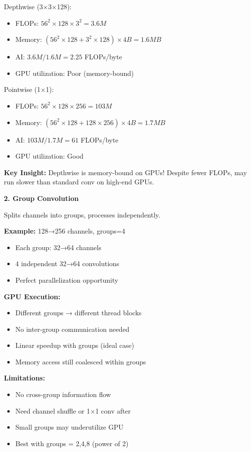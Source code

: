\documentclass[12pt]{article}
\newcommand{\explanation}[1]{{\color{explanationcolor}#1}}
\begin{document}
\begin{enumerate}[(a)]
{{    Depthwise (3×3×128):
    \begin{itemize}
        \item FLOPs: $56^2 \times 128 \times 3^2 = 3.6M$
        \item Memory: $(56^2 \times 128 + 3^2 \times 128) \times 4B = 1.6MB$
        \item AI: $3.6M / 1.6M = 2.25$ FLOPs/byte
        \item GPU utilization: Poor (memory-bound)
    \end{itemize}
    
    Pointwise (1×1):
    \begin{itemize}
        \item FLOPs: $56^2 \times 128 \times 256 = 103M$
        \item Memory: $(56^2 \times 128 + 128 \times 256) \times 4B = 1.7MB$
        \item AI: $103M / 1.7M = 61$ FLOPs/byte
        \item GPU utilization: Good
    \end{itemize}
    
    \textbf{Key Insight:}
    Depthwise is memory-bound on GPUs! Despite fewer FLOPs, may run slower than standard conv on high-end GPUs.
    }
    
    \textbf{2. Group Convolution}
    
    \explanation{
    Splits channels into groups, processes independently.
    
    \textbf{Example:} 128→256 channels, groups=4
    \begin{itemize}
        \item Each group: 32→64 channels
        \item 4 independent 32→64 convolutions
        \item Perfect parallelization opportunity
    \end{itemize}
    
    \textbf{GPU Execution:}
    \begin{itemize}
        \item Different groups → different thread blocks
        \item No inter-group communication needed
        \item Linear speedup with groups (ideal case)
        \item Memory access still coalesced within groups
    \end{itemize}
    
    \textbf{Limitations:}
    \begin{itemize}
        \item No cross-group information flow
        \item Need channel shuffle or 1×1 conv after
        \item Small groups may underutilize GPU
        \item Best with groups = 2,4,8 (power of 2)
    \end{itemize}
    
}}
\end{enumerate}
\end{document}
